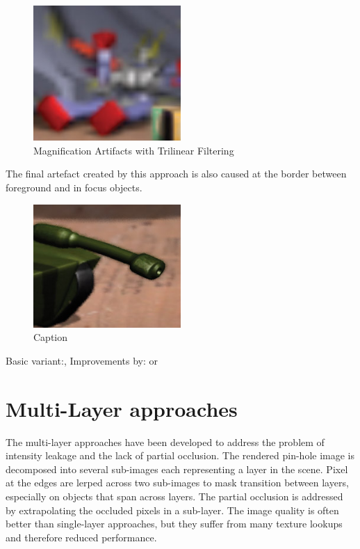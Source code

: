 \begin{figure}[h]
    \centering
    \includegraphics[width=0.5\textwidth]{images/trilinear-filtering.jpg}
    \caption{Magnification Artifacts with Trilinear Filtering \cite{Demers.2005}}
    \label{fig:trilinear-filtering}
\end{figure}

The final artefact created by this approach is also caused at the border between foreground and in focus objects.


\begin{figure}[h]
    \centering
    \includegraphics[width=0.5\textwidth]{images/pixel-bleeding.jpg}
    \caption{Caption}
    \label{fig:my_label}
\end{figure}

Basic variant:\cite{Gilham.2007}, 
Improvements by:\cite{Hammon.2008} or \cite{Lee.2009}

\section{Multi-Layer approaches}
The multi-layer approaches have been developed to address the problem of intensity leakage and the lack of partial occlusion.
The rendered pin-hole image is decomposed into several sub-images each representing a layer in the scene.
Pixel at the edges are lerped across two sub-images to mask transition between layers, especially on objects that span across layers.
The partial occlusion is addressed by extrapolating the occluded pixels in a sub-layer.
The image quality is often better than single-layer approaches, but they suffer from many texture lookups and therefore reduced performance.

\cite{Kraus.2007}


